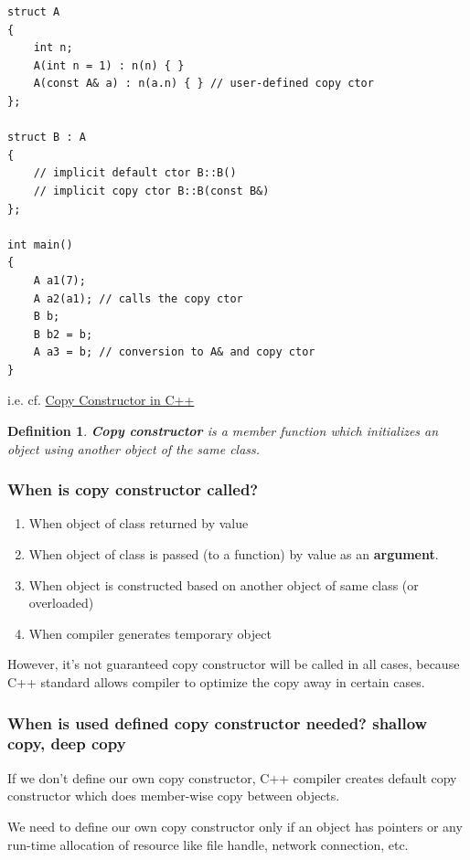 \documentclass[10pt]{amsart}
\newtheorem{definition}{Definition}
\begin{document}
\begin{multicols*}{2}
\begin{lstlisting}
struct A
{
	int n;
	A(int n = 1) : n(n) { }
	A(const A& a) : n(a.n) { } // user-defined copy ctor
};

struct B : A
{
	// implicit default ctor B::B()
	// implicit copy ctor B::B(const B&)
};

int main()
{
	A a1(7);
	A a2(a1); // calls the copy ctor
	B b;
	B b2 = b;
	A a3 = b; // conversion to A& and copy ctor  
}
\end{lstlisting}  

i.e. cf. \href{http://www.geeksforgeeks.org/copy-constructor-in-cpp/}{Copy Constructor in C++}

\begin{definition}
	\textbf{Copy constructor} is a member function which initializes an object using another object of the same class.  
\end{definition}

\subsubsection{When is copy constructor called? } 
\begin{enumerate}
\item When object of class returned by value 
\item When object of class is passed (to a function) by value as an \textbf{argument}.  
\item When object is constructed based on another object of same class  (or overloaded)  
\item When compiler generates temporary object  
\end{enumerate}


However, it's not guaranteed copy constructor will be called in all cases, because C++ standard allows compiler to optimize the copy away in certain cases.  

\subsubsection{When is used defined copy constructor needed?  shallow copy, deep copy}  

If we don't define our own copy constructor, C++ compiler creates default copy constructor which does member-wise copy between objects.  

We need to define our own copy constructor only if an object has pointers or any run-time allocation of resource like file handle, network connection, etc.  


\end{multicols*}
\end{document}
